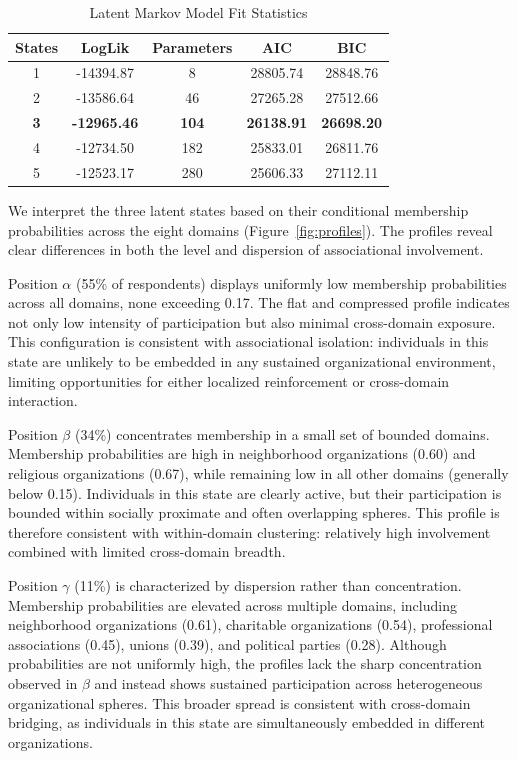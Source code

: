 \begin{table}[H]
\centering
\caption{Latent Markov Model Fit Statistics}
\label{table:model_fit}
\begin{tabular}{ccccc}
\hline
States & LogLik & Parameters & AIC & BIC \\
\hline
1 & -14394.87 & 8 & 28805.74 & 28848.76 \\ 
2 & -13586.64 & 46 & 27265.28 & 27512.66 \\ 
\textbf{3} & \textbf{-12965.46} & \textbf{104} & \textbf{26138.91} & \textbf{26698.20} \\ 
4 & -12734.50 & 182 & 25833.01 & 26811.76 \\
5 & -12523.17 & 280 & 25606.33 & 27112.11 \\
\hline
\end{tabular}
\end{table}

We interpret the three latent states based on their conditional membership probabilities across the eight domains (Figure~\ref{fig:profiles}). The profiles reveal clear differences in both the level and dispersion of associational involvement.

Position $\alpha$ (55\% of respondents) displays uniformly low membership probabilities across all domains, none exceeding 0.17. The flat and compressed profile indicates not only low intensity of participation but also minimal cross-domain exposure. This configuration is consistent with associational isolation: individuals in this state are unlikely to be embedded in any sustained organizational environment, limiting opportunities for either localized reinforcement or cross-domain interaction.

Position $\beta$ (34\%) concentrates membership in a small set of bounded domains. Membership probabilities are high in neighborhood organizations (0.60) and religious organizations (0.67), while remaining low in all other domains (generally below 0.15). Individuals in this state are clearly active, but their participation is bounded within socially proximate and often overlapping spheres. This profile is therefore consistent with within-domain clustering: relatively high involvement combined with limited cross-domain breadth.

Position $\gamma$ (11\%) is characterized by dispersion rather than concentration. Membership probabilities are elevated across multiple domains, including neighborhood organizations (0.61), charitable organizations (0.54), professional associations (0.45), unions (0.39), and political parties (0.28). Although probabilities are not uniformly high, the profiles lack the sharp concentration observed in $\beta$ and instead shows sustained participation across heterogeneous organizational spheres. This broader spread is consistent with cross-domain bridging, as individuals in this state are simultaneously embedded in different organizations.

